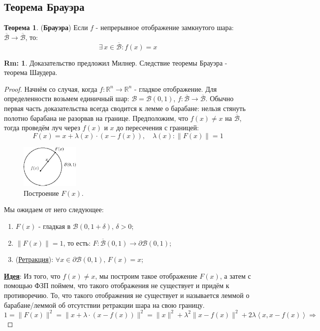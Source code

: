 \documentclass[12pt]{article}
\newcommand{\MR}{\mathbb{R}}
\newcommand{\MB}{\mathcal{B}}
\theoremstyle{definition}
\newtheorem{rem}{Rm:}
\newtheorem{theorem}{Теорема}
\newcommand{\inner}[2]{\left\langle #1, #2 \right\rangle }
\newcommand{\ovl}[1]{\overline{#1}}
\begin{document}
\subsection*{Теорема Брауэра}
\begin{theorem}(\textbf{Брауэра})
	Если $f$ - непрерывное отображение замкнутого шара: $\ovl{\MB} \to \ovl{\MB}$, то:
	$$
		\exists \, x \in \ovl{\MB} \colon f(x) = x
	$$
\end{theorem}
\begin{rem}
	Доказательство предложил Милнер. Следствие теоремы Брауэра - теорема Шаудера.
\end{rem}
\begin{proof}
	Начнём со случая, когда $f \colon \MR^n \to \MR^n$ - гладкое отображение. Для определенности возьмем единичный шар: $\MB = \MB(0,1)$, $f\colon \ovl{\MB} \to \ovl{\MB}$. Обычно первая часть доказательства всегда сводится к лемме о барабане: нельзя стянуть полотно барабана не разорвав на границе. Предположим, что $f(x) \neq x$ на $\ovl{\MB}$, тогда проведём луч через $f(x)$ и $x$ до пересечения с границей:
	$$
		F(x) = x + \lambda(x){\cdot}(x - f(x)), \quad \lambda(x) \colon \|F(x)\| = 1
	$$
	\begin{figure}[H]
		\centering
		\includegraphics[width=0.25\textwidth]{MA4L7_1.eps}
		\caption{Построение $F(x)$.}
		\label{7_1}
	\end{figure}
	Мы ожидаем от него следующее:
	\begin{enumerate}[label=(\arabic*)]
		\item $F(x)$ - гладкая в $\MB(0,1 + \delta), \, \delta > 0$;
		\item $\|F(x)\| = 1$, то есть: $F \colon \ovl{\MB}(0,1) \to \partial \MB(0,1)$;
		\item (\uline{Ретракция}): $\forall x \in \partial \MB(0,1), \, F(x) = x$;
	\end{enumerate}
	\textbf{\uline{Идея}}: Из того, что $f(x) \neq x$, мы построим такое отображение $F(x)$, а затем с помощью ФЗП поймем, что такого отображения не существует и придём к противоречию. То, что такого отображения не существует и называется леммой о барабане/леммой об отсутствии ретракции шара на свою границу.
	$$
		1 = \|F(x)\|^2 = \|x + \lambda{\cdot}(x - f(x))\|^2 = \|x\|^2 + \lambda^2\|x - f(x)\|^2 + 2 \lambda\inner{x}{x - f(x)} \Rightarrow
$$
\end{proof}
\end{document}
